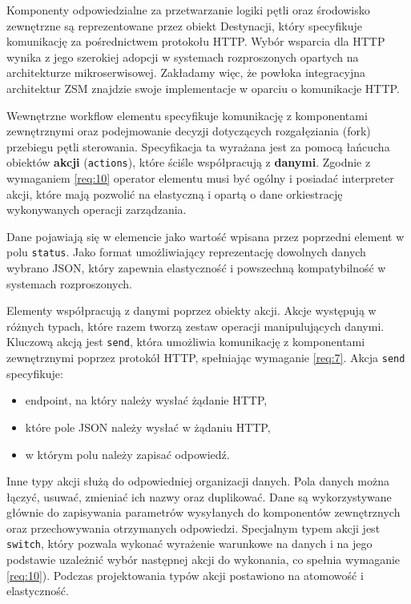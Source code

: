 Komponenty odpowiedzialne za przetwarzanie logiki pętli oraz środowisko zewnętrzne są reprezentowane przez obiekt Destynacji, który specyfikuje komunikację za pośrednictwem protokołu HTTP. Wybór wsparcia dla HTTP wynika z jego szerokiej adopcji w systemach rozproszonych opartych na architekturze mikroserwisowej. Zakładamy więc, że powłoka integracyjna architektur ZSM znajdzie swoje implementacje w oparciu o komunikacje HTTP.

Wewnętrzne workflow elementu specyfikuje komunikację z komponentami zewnętrznymi oraz podejmowanie decyzji dotyczących rozgałęziania (fork) przebiegu pętli sterowania. Specyfikacja ta wyrażana jest za pomocą łańcucha obiektów \textbf{akcji} (\texttt{actions}), które ściśle współpracują z \textbf{danymi}. Zgodnie z wymaganiem \ref{req:10} operator elementu musi być ogólny i posiadać interpreter akcji, które mają pozwolić na elastyczną i opartą o dane orkiestrację wykonywanych operacji zarządzania. 

Dane pojawiają się w elemencie jako wartość wpisana przez poprzedni element w polu \texttt{status}. Jako format umożliwiający reprezentację dowolnych danych wybrano JSON, który zapewnia elastyczność i powszechną kompatybilność w systemach rozproszonych.

Elementy współpracują z danymi poprzez obiekty akcji. Akcje występują w różnych typach, które razem tworzą zestaw operacji manipulujących danymi. Kluczową akcją jest \texttt{send}, która umożliwia komunikację z komponentami zewnętrznymi poprzez protokół HTTP, spełniając wymaganie \ref{req:7}. Akcja \texttt{send} specyfikuje:
\begin{itemize}
    \item endpoint, na który należy wysłać żądanie HTTP,
    \item które pole JSON należy wysłać w żądaniu HTTP,
    \item w którym polu należy zapisać odpowiedź.
\end{itemize}


Inne typy akcji służą do odpowiedniej organizacji danych. Pola danych można łączyć, usuwać, zmieniać ich nazwy oraz duplikować. Dane są wykorzystywane głównie do zapisywania parametrów wysyłanych do komponentów zewnętrznych oraz przechowywania otrzymanych odpowiedzi. Specjalnym typem akcji jest \texttt{switch}, który pozwala wykonać wyrażenie warunkowe na danych i na jego podstawie uzależnić wybór następnej akcji do wykonania, co spełnia wymaganie \ref{req:10}). Podczas projektowania typów akcji postawiono na atomowość i elastyczność.


